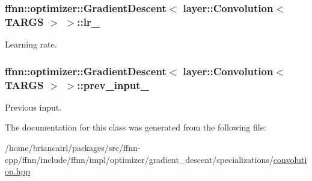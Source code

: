 \hypertarget{classffnn_1_1optimizer_1_1_gradient_descent_3_01layer_1_1_convolution_3_01_t_a_r_g_s_01_4_01_4_a756ac46b510f19492b0a7874a8f6831b}{
\subsubsection[{lr\-\_\-}]{ {\bf ffnn\-::optimizer\-::\-Gradient\-Descent}$<$ {\bf layer\-::\-Convolution}$<$ {\bf T\-A\-R\-G\-S} $>$ $>$\-::lr\-\_\-\hspace{0.3cm}{\ttfamily [protected]}}}\label{classffnn_1_1optimizer_1_1_gradient_descent_3_01layer_1_1_convolution_3_01_t_a_r_g_s_01_4_01_4_a756ac46b510f19492b0a7874a8f6831b}


Learning rate. 

\hypertarget{classffnn_1_1optimizer_1_1_gradient_descent_3_01layer_1_1_convolution_3_01_t_a_r_g_s_01_4_01_4_afb2c039078e26446400314336dc24482}{
\subsubsection[{prev\-\_\-input\-\_\-}]{ {\bf ffnn\-::optimizer\-::\-Gradient\-Descent}$<$ {\bf layer\-::\-Convolution}$<$ {\bf T\-A\-R\-G\-S} $>$ $>$\-::prev\-\_\-input\-\_\-\hspace{0.3cm}{\ttfamily [protected]}}}\label{classffnn_1_1optimizer_1_1_gradient_descent_3_01layer_1_1_convolution_3_01_t_a_r_g_s_01_4_01_4_afb2c039078e26446400314336dc24482}


Previous input. 



The documentation for this class was generated from the following file\-:\begin{DoxyCompactItemize}
\item 
/home/briancairl/packages/src/ffnn-\/cpp/ffnn/include/ffnn/impl/optimizer/gradient\-\_\-descent/specializations/\hyperlink{optimizer_2gradient__descent_2specializations_2convolution_8hpp}{convolution.\-hpp}\end{DoxyCompactItemize}
